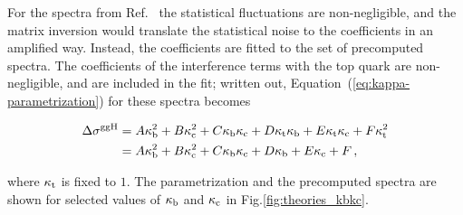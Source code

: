 For the spectra from Ref.~\cite{Bishara:2016jga} the statistical fluctuations are non-negligible, and the matrix inversion would translate the statistical noise to the coefficients in an amplified way.
% 
Instead, the coefficients are fitted to the set of precomputed spectra.
% 
The coefficients of the interference terms with the top quark are non-negligible, and are included in the fit; written out, Equation~(\ref{eq:kappa-parametrization}) for these spectra becomes
% 
\begin{linenomath*}
\begin{equation}
\begin{split}
\Delta\sigma^{\mathrm{g}\mathrm{g}\mathrm{H}}
  & = A \kappa_{\mathrm{b}}^2 + B \kappa_{\mathrm{c}}^2 + C \kappa_{\mathrm{b}} \kappa_{\mathrm{c}}
    + D \kappa_{\mathrm{t}} \kappa_{\mathrm{b}} + E \kappa_{\mathrm{t}} \kappa_{\mathrm{c}} + F \kappa_{\mathrm{t}}^2
  \\
  & = A \kappa_{\mathrm{b}}^2 + B \kappa_{\mathrm{c}}^2 + C \kappa_{\mathrm{b}} \kappa_{\mathrm{c}}
    + D \kappa_{\mathrm{b}} + E \kappa_{\mathrm{c}} + F
  \,,
\end{split}
\end{equation}
\end{linenomath*}
% 
where $\kappa_{\mathrm{t}}$ is fixed to $1$.
% 
The parametrization and the precomputed spectra are shown for selected values of $\kappa_{\mathrm{b}}$ and $\kappa_{\mathrm{c}}$ in Fig.\ref{fig:theories_kbkc}.


